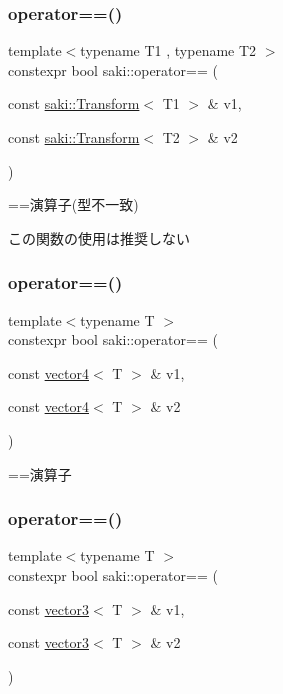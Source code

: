 \subsubsection{\texorpdfstring{operator==()}{operator==()}\hspace{0.1cm}{\footnotesize\ttfamily [3/11]}}
{\footnotesize\ttfamily template$<$typename T1 , typename T2 $>$ \\
constexpr bool saki\+::operator== (\begin{DoxyParamCaption}\item[{const \mbox{\hyperlink{classsaki_1_1_transform}{saki\+::\+Transform}}$<$ T1 $>$ \&}]{v1,  }\item[{const \mbox{\hyperlink{classsaki_1_1_transform}{saki\+::\+Transform}}$<$ T2 $>$ \&}]{v2 }\end{DoxyParamCaption})}



==演算子(型不一致) 

この関数の使用は推奨しない \mbox{\label{namespacesaki_abe77ceb7257097320a66f9f182d11111}} 
\subsubsection{\texorpdfstring{operator==()}{operator==()}\hspace{0.1cm}{\footnotesize\ttfamily [4/11]}}
{\footnotesize\ttfamily template$<$typename T $>$ \\
constexpr bool saki\+::operator== (\begin{DoxyParamCaption}\item[{const \mbox{\hyperlink{classsaki_1_1vector4}{vector4}}$<$ T $>$ \&}]{v1,  }\item[{const \mbox{\hyperlink{classsaki_1_1vector4}{vector4}}$<$ T $>$ \&}]{v2 }\end{DoxyParamCaption})}



==演算子 

\mbox{\label{namespacesaki_a3ce1faca02399d52a09851a1b6e8afe3}} 
\subsubsection{\texorpdfstring{operator==()}{operator==()}\hspace{0.1cm}{\footnotesize\ttfamily [5/11]}}
{\footnotesize\ttfamily template$<$typename T $>$ \\
constexpr bool saki\+::operator== (\begin{DoxyParamCaption}\item[{const \mbox{\hyperlink{classsaki_1_1vector3}{vector3}}$<$ T $>$ \&}]{v1,  }\item[{const \mbox{\hyperlink{classsaki_1_1vector3}{vector3}}$<$ T $>$ \&}]{v2 }\end{DoxyParamCaption})}



